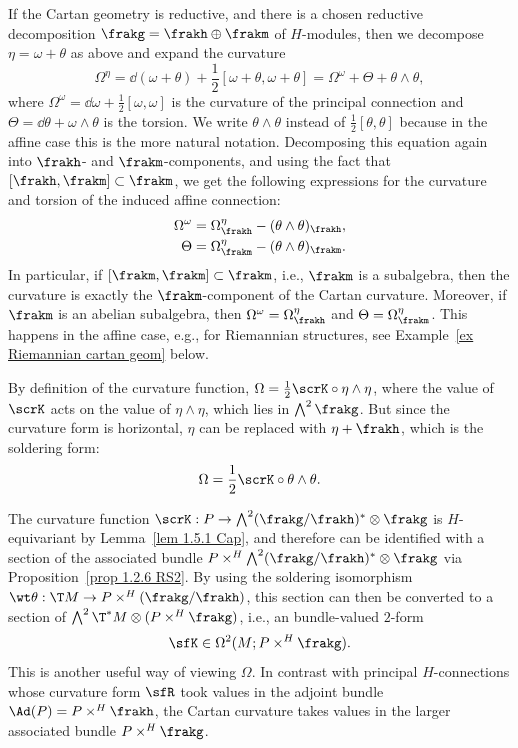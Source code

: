 \begin{rem}\label{rem torsion in reductive geom}
    If the Cartan geometry is reductive, and there is a chosen reductive decomposition $\frakg=\frakh\oplus\frakm$ of $H$-modules, then we decompose $\eta=\omega+\theta$ as above and expand the curvature 
    \[
        \Omega^\eta=\dd (\omega+\theta)+\frac12[\omega+\theta,\omega+\theta]=\Omega^\omega+\Theta+\theta\wedge\theta,\label{eq curvature of reductive}
    \]
    where $\Omega^\omega=\dd\omega+\frac12[\omega,\omega]$ is the curvature of the principal connection and $\Theta=\dd\theta+\omega\wedge\theta$ is the torsion. We write $\theta\wedge\theta$ instead of $\frac12[\theta,\theta]$ because in the affine case this is the more natural notation. Decomposing this equation again into $\frakh$- and $\frakm$-components, and using the fact that $[\frakh,\frakm]\subset \frakm$, we get the following expressions for the curvature and torsion of the induced affine connection:
    \begin{align}
        \Omega^\omega&=\Omega^\eta_\frakh-(\theta\wedge\theta)_{\frakh},\\
        \Theta&=\Omega^\eta_\frakm-(\theta\wedge\theta)_\frakm.
    \end{align}
    In particular, if $[\frakm,\frakm]\subset\frakm$, i.e., $\frakm$ is a subalgebra, then the curvature is exactly the $\frakm$-component of the Cartan curvature. Moreover, if $\frakm$ is an abelian subalgebra, then $\Omega^\omega=\Omega^\eta_\frakh$ and $\Theta=\Omega^\eta_\frakm$. This happens in the affine case, e.g., for Riemannian structures, see Example~\ref{ex Riemannian cartan geom} below.
\end{rem}

\begin{rem}
    By definition of the curvature function, $\Omega=\frac12\scrK\circ \eta\wedge\eta$, where the value of $\scrK$ acts on the value of $\eta\wedge\eta$, which lies in $\bigwedge^2\frakg$. But since the curvature form is horizontal, $\eta$ can be replaced with $\eta+\frakh$, which is the soldering form:
    \[\Omega=\frac12\scrK \circ \theta\wedge\theta.\]

    The curvature function $\scrK:P\to \bigwedge^2(\frakg\slash\frakh)^\ast\otimes\frakg$ is $H$-equivariant by Lemma~\ref{lem 1.5.1 Cap}, and therefore can be identified with a section of the associated bundle $P\times^H \bigwedge^2(\frakg\slash\frakh)^\ast\otimes\frakg$ via Proposition~\ref{prop 1.2.6 RS2}. By using the soldering isomorphism $\wt\theta:\T M\to P\times^H(\frakg\slash\frakh)$, this section can then be converted to a section of $\bigwedge^2\T^\ast M\otimes (P\times^H\frakg)$, i.e., an bundle-valued $2$-form 
    \[\sfK\in \Omega^2(M;P\times^H\frakg).\] 
    This is another useful way of viewing $\Omega$. In contrast with principal $H$-connections whose curvature form $\sfR$ took values in the adjoint bundle $\Ad(P)=P\times^H \frakh$, the Cartan curvature takes values in the larger associated bundle $P\times^H \frakg$.
\end{rem}



